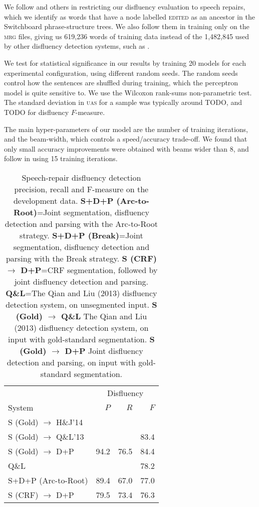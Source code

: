\documentclass[11pt,letterpaper]{article}
\begin{document}
We follow \citet{Johnson04a} and others in restricting our disfluency evaluation
to speech repairs, which we identify as words that have a node labelled \textsc{edited}
as an ancestor in the Switchboard phrase-structure trees.  We also follow them
in training only on the \textsc{mrg} files, giving us 619,236 words of training
data instead of the 1,482,845 used by other disfluency detection systems, such
as \citet{qian:13}.

We test for statistical significance in our results by training 20 models for
each experimental configuration, using different random seeds. The random seeds
control how the sentences are shuffled during training, which the perceptron
model is quite sensitive to.  We use the Wilcoxon rank-sums non-parametric test.
The standard deviation in \textsc{uas} for a sample was typically around TODO,
and TODO for disfluency $F$-measure.

The main hyper-parameters of our model are the number of training iterations,
and the beam-width, which controls a speed/accuracy trade-off.  We found that
only small accuracy improvements were obtained with beams wider than 8, and follow
\citet{honnibal:14} in using 15 training iterations.  

\begin{table}
    \centering
    \small
    \begin{tabular}{l|rrr}
               & \multicolumn{3}{c}{Disfluency} \\
        System & $P$ & $R$ & $F$ \\
        \hline \hline
        S (Gold) $\rightarrow$ H\&J'14 & & & \\
        S (Gold) $\rightarrow$ Q\&L'13 & & & 83.4 \\
        S (Gold) $\rightarrow$ D+P & 94.2 & 76.5 & 84.4 \\
        \hline
        Q\&L  & & & 78.2 \\
        \hline
        S+D+P (Arc-to-Root) & 89.4 & 67.0 & 77.0 \\
        S (CRF) $\rightarrow$ D+P & 79.5 & 73.4 & 76.3 \\
        \hline
   \end{tabular}
    \caption{\small Speech-repair disfluency detection precision, recall and
        F-measure on the development data.
        \textbf{S+D+P (Arc-to-Root)}=Joint segmentation, disfluency detection
        and parsing with the Arc-to-Root strategy.
        \textbf{S+D+P (Break)}=Joint
        segmentation, disfluency detection and parsing with the Break strategy.
        \textbf{S (CRF) $\rightarrow$ D+P}=CRF segmentation, followed by joint
        disfluency detection and parsing.
        \textbf{Q\&L}=The Qian and Liu (2013)
        disfluency detection system, on unsegmented input.
        \textbf{S (Gold) $\rightarrow$ Q\&L} The Qian and Liu (2013) disfluency
        detection system, on input with gold-standard segmentation.
        \textbf{S (Gold) $\rightarrow$ D+P} Joint disfluency detection and parsing,
             on input with gold-standard segmentation. \label{tab:dfl}}
\vspace*{-4em}
\end{table}
\end{document}
